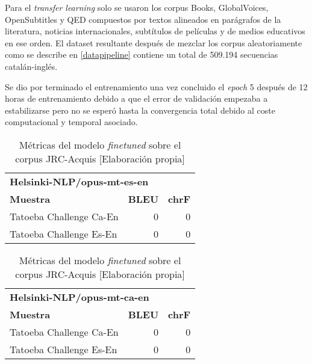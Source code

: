 Para el \textit{transfer learning} solo se usaron los corpus Books, GlobalVoices, OpenSubtitles y QED compuestos por textos alineados en parágrafos de la literatura, noticias internacionales, subtítulos de películas y de medios educativos en ese orden.
El dataset resultante después de mezclar los corpus aleatoriamente como se describe en \ref{datapipeline} contiene un total de 509.194 secuencias catalán-inglés.

Se dio por terminado el entrenamiento una vez concluido el \textit{epoch} 5 después de 12 horas de entrenamiento debido a que el error de validación empezaba a estabilizarse pero no se esperó hasta la convergencia total debido al coste computacional y temporal asociado.

\begin{table}[H]
    \begin{center}
        \begin{tabular}{ l r r }
        \multicolumn{3}{l}{\textbf{Helsinki-NLP/opus-mt-es-en}}\\
        \textbf{Muestra} & \textbf{BLEU} & \textbf{chrF} \\
        Tatoeba Challenge Ca-En & 0 & 0 \\
        Tatoeba Challenge Es-En & 0 & 0
        \end{tabular}
        \caption{Métricas del modelo \textit{finetuned} sobre el corpus JRC-Acquis [Elaboración propia]}\label{transferorigesen}
    \end{center}
\end{table}

\begin{table}[H]
    \begin{center}
        \begin{tabular}{ l r r }
        \multicolumn{3}{l}{\textbf{Helsinki-NLP/opus-mt-ca-en}}\\
        \textbf{Muestra} & \textbf{BLEU} & \textbf{chrF} \\
        Tatoeba Challenge Ca-En & 0 & 0 \\
        Tatoeba Challenge Es-En & 0 & 0
        \end{tabular}
        \caption{Métricas del modelo \textit{finetuned} sobre el corpus JRC-Acquis [Elaboración propia]}\label{transferorigcaen}
    \end{center}
\end{table}

